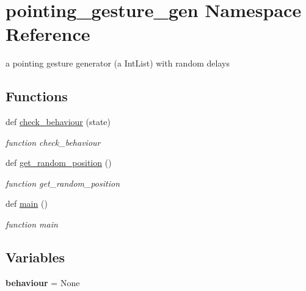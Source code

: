 \hypertarget{namespacepointing__gesture__gen}{}\section{pointing\+\_\+gesture\+\_\+gen Namespace Reference}
\label{namespacepointing__gesture__gen}


a pointing gesture generator (a Int\+List) with random delays  


\subsection*{Functions}
\begin{DoxyCompactItemize}
\item 
def \hyperlink{namespacepointing__gesture__gen_aa707c4f8399bd0aa948ee489b0b6206a}{check\+\_\+behaviour} (state)
\begin{DoxyCompactList}\small\item\em function check\+\_\+behaviour \end{DoxyCompactList}\item 
def \hyperlink{namespacepointing__gesture__gen_aa0ae8c4b1eafa64c85ea9fd8203534d5}{get\+\_\+random\+\_\+position} ()
\begin{DoxyCompactList}\small\item\em function get\+\_\+random\+\_\+position \end{DoxyCompactList}\item 
\mbox{\label{namespacepointing__gesture__gen_a83d28509eb84c08a4a7564948be46458}} 
def \hyperlink{namespacepointing__gesture__gen_a83d28509eb84c08a4a7564948be46458}{main} ()
\begin{DoxyCompactList}\small\item\em function main \end{DoxyCompactList}\end{DoxyCompactItemize}
\subsection*{Variables}
\begin{DoxyCompactItemize}
\item 
\mbox{\label{namespacepointing__gesture__gen_a0e93d4289accd275c70418f6353ce085}} 
{\bfseries behaviour} = None
\end{DoxyCompactItemize}


